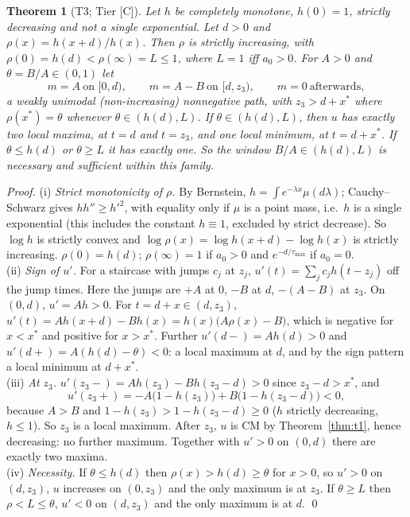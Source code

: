 \documentclass[10pt]{article}
\newcommand{\tier}[1]{\textsf{[#1]}}
\newcommand{\tC}{\tier{C}}
\theoremstyle{plain}
\newtheorem{thm}{Theorem}
\begin{document}
\begin{thm}[T3; Tier \tC{}]\label{thm:t3}
Let $h$ be completely monotone, $h(0)=1$, strictly decreasing and not a single exponential. Let $d>0$ and $\rho(x)=h(x+d)/h(x)$. Then $\rho$ is strictly increasing, with $\rho(0)=h(d)<\rho(\infty)=L\le1$, where $L=1$ iff $a_0>0$. For $A>0$ and $\theta=B/A\in(0,1)$ let
$$m=A\ \text{on }[0,d),\qquad m=A-B\ \text{on }[d,z_3),\qquad m=0\ \text{afterwards},$$
a weakly unimodal (non-increasing) nonnegative path, with $z_3>d+x^*$ where $\rho(x^*)=\theta$ whenever $\theta\in(h(d),L)$. If $\theta\in(h(d),L)$, then $u$ has \emph{exactly two} local maxima, at $t=d$ and $t=z_3$, and one local minimum, at $t=d+x^*$. If $\theta\le h(d)$ or $\theta\ge L$ it has exactly one. So the window $B/A\in(h(d),L)$ is necessary and sufficient within this family.
\end{thm}
\emph{Proof.} (i) \emph{Strict monotonicity of $\rho$.} By Bernstein, $h=\int e^{-\lambda x}\mu(d\lambda)$; Cauchy--Schwarz gives $hh''\ge h'^2$, with equality only if $\mu$ is a point mass, i.e.\ $h$ is a single exponential (this includes the constant $h\equiv1$, excluded by strict decrease). So $\log h$ is strictly convex and $\log\rho(x)=\log h(x+d)-\log h(x)$ is strictly increasing. $\rho(0)=h(d)$; $\rho(\infty)=1$ if $a_0>0$ and $e^{-d/\tau_{\max}}$ if $a_0=0$.\\
(ii) \emph{Sign of $u'$.} For a staircase with jumps $c_j$ at $z_j$, $u'(t)=\sum_jc_jh(t-z_j)$ off the jump times. Here the jumps are $+A$ at $0$, $-B$ at $d$, $-(A-B)$ at $z_3$. On $(0,d)$, $u'=Ah>0$. For $t=d+x\in(d,z_3)$,
$u'(t)=Ah(x+d)-Bh(x)=h(x)\bigl(A\rho(x)-B\bigr)$, which is negative for $x<x^*$ and positive for $x>x^*$. Further $u'(d-)=Ah(d)>0$ and $u'(d+)=A(h(d)-\theta)<0$: a local maximum at $d$, and by the sign pattern a local minimum at $d+x^*$.\\
(iii) \emph{At $z_3$.} $u'(z_3-)=Ah(z_3)-Bh(z_3-d)>0$ since $z_3-d>x^*$, and
$$u'(z_3+)=-A\bigl(1-h(z_3)\bigr)+B\bigl(1-h(z_3-d)\bigr)<0,$$
because $A>B$ and $1-h(z_3)>1-h(z_3-d)\ge0$ ($h$ strictly decreasing, $h\le1$). So $z_3$ is a local maximum. After $z_3$, $u$ is CM by Theorem~\ref{thm:t1}, hence decreasing: no further maximum. Together with $u'>0$ on $(0,d)$ there are exactly two maxima.\\
(iv) \emph{Necessity.} If $\theta\le h(d)$ then $\rho(x)>h(d)\ge\theta$ for $x>0$, so $u'>0$ on $(d,z_3)$, $u$ increases on $(0,z_3)$ and the only maximum is at $z_3$. If $\theta\ge L$ then $\rho<L\le\theta$, $u'<0$ on $(d,z_3)$ and the only maximum is at $d$. \qed
\end{document}
